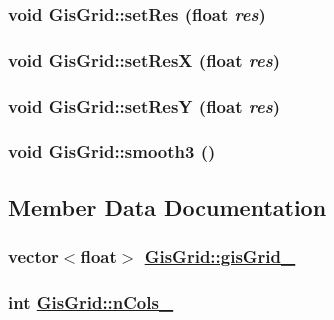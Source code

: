 \hypertarget{classGisGrid_a6}{
\subsubsection[setRes]{\setlength{\rightskip}{0pt plus 5cm}void Gis\-Grid::set\-Res (float {\em res})}}
\label{classGisGrid_a6}


\hypertarget{classGisGrid_a7}{
\subsubsection[setResX]{\setlength{\rightskip}{0pt plus 5cm}void Gis\-Grid::set\-Res\-X (float {\em res})}}
\label{classGisGrid_a7}


\hypertarget{classGisGrid_a9}{
\subsubsection[setResY]{\setlength{\rightskip}{0pt plus 5cm}void Gis\-Grid::set\-Res\-Y (float {\em res})}}
\label{classGisGrid_a9}


\hypertarget{classGisGrid_a23}{
\subsubsection[smooth3]{\setlength{\rightskip}{0pt plus 5cm}void Gis\-Grid::smooth3 ()}}
\label{classGisGrid_a23}




\subsection{Member Data Documentation}
\hypertarget{classGisGrid_o9}{
\subsubsection[gisGrid\_\-]{\setlength{\rightskip}{0pt plus 5cm}vector$<$float$>$ \hyperlink{classGisGrid_o9}{Gis\-Grid::gis\-Grid\_\-}}}
\label{classGisGrid_o9}


\hypertarget{classGisGrid_o7}{
\subsubsection[nCols\_\-]{\setlength{\rightskip}{0pt plus 5cm}int \hyperlink{classGisGrid_o7}{Gis\-Grid::n\-Cols\_\-}}}
\label{classGisGrid_o7}


